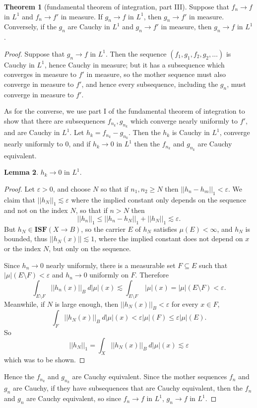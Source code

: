 \documentclass[12pt]{book}
\newcommand{\ISF}{\mathbf{ISF}}
\theoremstyle{definition}
\newtheorem{theorem}{Theorem}[section]
\newtheorem{lemma}[theorem]{Lemma}
\begin{document}
\begin{theorem}[fundamental theorem of integration, part III]
Suppose that $f_n \to f$ in $L^1$ and $f_n \to f'$ in measure.
If $g_n \to f$ in $L^1$, then $g_n \to f'$ in measure.
Conversely, if the $g_n$ are Cauchy in $L^1$ and $g_n \to f'$ in measure, then $g_n \to f$ in $L^1$.
\end{theorem}
\begin{proof}
Suppose that $g_n \to f$ in $L^1$.
Then the sequence $(f_1, g_1, f_2, g_2, \dots)$ is Cauchy in $L^1$, hence Cauchy in measure; but it has a subsequence which converges in measure to $f'$ in measure, so the mother sequence must also converge in measure to $f'$, and hence every subsequence, including the $g_n$, must converge in measure to $f'$.

As for the converse, we use part I of the fundamental theorem of integration to show that there are subsequences $f_{n_k}, g_{n_k}$ which converge nearly uniformly to $f'$, and are Cauchy in $L^1$.
Let $h_k = f_{n_k} - g_{n_k}$. Then the $h_k$ is Cauchy in $L^1$, converge nearly uniformly to $0$, and if $h_k \to 0$ in $L^1$ then the $f_{n_k}$ and $g_{n_k}$ are Cauchy equivalent.
\begin{lemma}
$h_k \to 0$ in $L^1$.
\end{lemma}
\begin{proof}
Let $\varepsilon > 0$, and choose $N$ so that if $n_1, n_2 \geq N$ then $||h_n - h_m||_1 < \varepsilon$. We claim that $||h_N||_1 \lesssim \varepsilon$ where the implied constant only depends on the sequence and not on the index $N$, so that if $n > N$ then
$$||h_n||_1 \leq ||h_n - h_N||_1 + ||h_N||_1 \lesssim \varepsilon.$$
But $h_N \in \ISF(X \to B)$, so the carrier $E$ of $h_N$ satisfies $\mu(E) < \infty$, and $h_N$ is bounded, thus $||h_N(x)|| \lesssim 1$, where the implied constant does not depend on $x$ or the index $N$, but only on the sequence.

Since $h_n \to 0$ nearly uniformly, there is a measurable set $F \subseteq E$ such that $|\mu|(E \setminus F) < \varepsilon$ and $h_n \to 0$ uniformly on $F$. Therefore
$$\int_{E \setminus F} ||h_n(x)||_B ~d|\mu|(x) \lesssim \int_{E \setminus F} ~|\mu|(x) = |\mu|(E \setminus F) < \varepsilon.$$
Meanwhile, if $N$ is large enough, then $||h_N(x)||_B < \varepsilon$ for every $x \in F$,
$$\int_F ||h_N(x)||_B~d|\mu|(x) < \varepsilon |\mu|(F) \leq \varepsilon |\mu|(E).$$
So
$$||h_N||_1 = \int_X ||h_N(x)||_B ~d|\mu|(x) \lesssim \varepsilon$$
which was to be shown.
\end{proof}

Hence the $f_{n_k}$ and $g_{n_k}$ are Cauchy equivalent.
Since the mother sequences $f_n$ and $g_n$ are Cauchy, if they have subsequences that are Cauchy equivalent, then the $f_n$ and $g_n$ are Cauchy equivalent, so since $f_n \to f$ in $L^1$, $g_n \to f$ in $L^1$.
\end{proof}
\end{document}
